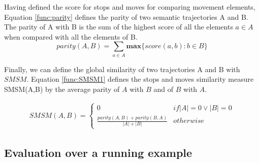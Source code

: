 \documentclass[12pt]{article}
\begin{document}
Having defined the score for stops and moves for comparing movement elements, Equation \ref{func:parity} defines the parity of two semantic trajectories A and B. The parity of A with B is
the sum of the highest score of all the elements $a \in A$ when compared with all the elements of B.
\begin{equation}
\label{func:parity}
parity(A, B) = \sum\limits_{a\in A} \textbf{max}\{\textit{score}(a, b) : b \in B\}
\end{equation}

Finally, we can define the global similarity of two trajectories A and B with $SMSM$. Equation \ref{func:SMSM1} defines the stops and moves similarity measure SMSM(A,B) by the average parity of $A$ with $B$ and of $B$ with $A$.

\begin{equation}
\label{func:SMSM1}
\begin{split}
  SMSM(A, B) = 
  \begin{cases} 
      0 & if  |A| = 0 \vee |B| = 0 \\
      \frac{parity(A, B) + parity(B, A)}{|A| + |B|} & otherwise
  \end{cases}
\end{split}
\end{equation}



\subsection{Evaluation over a running example}
\end{document}
